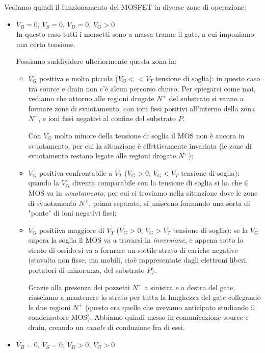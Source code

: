 \documentclass[a4paper,11pt]{article}
\begin{document}
Vediamo quindi il funzionamento del MOSFET in diverse zone di operazione:
\begin{itemize}
\item $V_B = 0$, $V_S = 0$, $V_D = 0$, $V_G > 0$ \\
In questo caso tutti i morsetti sono a massa tranne il gate, a cui imponiamo una certa tensione.

Possiamo suddividere ulteriormente questa zona in:
\begin{itemize}
\item $V_G$ positiva e molto piccola ($V_G << V_T$ tensione di soglia): in questo caso tra source e drain non c'è alcun percorso chiuso. Per spiegarci come mai, vediamo che attorno alle regioni drogate $N^+$ del substrato si vanno a formare zone di svuotamento, con ioni fissi positivi all'interno della zona $N^+$, e ioni fissi negativi al confine del substrato $P$. 

Con $V_G$ molto minore della tensione di soglia il MOS non è ancora in svuotamento, per cui la situazione è effettivamente invariata (le zone di svuotamento restano legate alle regioni drogate $N^+$);

\item $V_G$ positiva confrontabile a $V_T$ ($V_G > 0$, $V_G < V_T$ tensione di soglia): quando la $V_G$ diventa comparabile con la tensione di soglia si ha che il MOS va in \textit{svuotamento}, per cui ci troviamo nella situazione dove le zone di svuotamento $N^+$, prima separate, si uniscono formando una sorta di "ponte" di ioni negativi fissi;

\item $V_G$ positiiva maggiore di $V_T$ ($V_G > 0$, $V_G > V_T$ tensione di soglia): se la $V_G$ supera la soglia il MOS va a trovarsi in \textit{inversione}, e appena sotto lo strato di ossido si va a formare un sottile strato di cariche negative (stavolta non fisse, ma mobili, cioè rappresentate dagli elettroni liberi, portatori di minoranza, del substrato $P$). 

Grazie alla presenza dei pozzetti $N^+$ a sinistra e a destra del gate, riusciamo a mantenere lo strato per tutta la lunghezza del gate collegando le due regioni $N^+$ (questo era quello che avevamo anticipato studiando il condensatore MOS). Abbiamo quindi messo in comunicazione source e drain, creando un \textit{canale} di conduzione fra di essi.
\end{itemize}

\item $V_B = 0$, $V_S = 0$, $V_D > 0$, $V_G > 0$ \\


\end{itemize}
\end{document}
